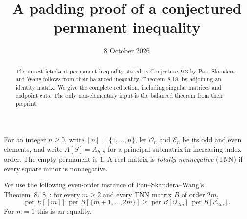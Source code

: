 \documentclass[11pt]{article}
\title{A padding proof of a conjectured permanent inequality}
\author{}
\date{8 October 2026}
\newcommand{\per}{\operatorname{per}}
\newcommand{\OO}{\mathcal O}
\newcommand{\EE}{\mathcal E}
\begin{document}
\maketitle
\begin{abstract}
The unrestricted-cut permanent inequality stated as Conjecture~9.3 by Pan, Skandera, and Wang follows from their balanced inequality, Theorem~8.18, by adjoining an identity matrix. We give the complete reduction, including singular matrices and endpoint cuts. The only non-elementary input is the balanced theorem from their preprint.
\end{abstract}
For an integer $n\geq 0$, write $[n]=\{1,\dots,n\}$, let $\OO_n$ and $\EE_n$ be its odd and even elements, and write $A[S]=A_{S,S}$ for a principal submatrix in increasing index order. The empty permanent is $1$. A real matrix is \emph{totally nonnegative} (TNN) if every square minor is nonnegative.

We use the following even-order instance of Pan--Skandera--Wang's Theorem~8.18~\cite{PSW}: for every $m\geq2$ and every TNN matrix $B$ of order $2m$,
\begin{equation}\label{balanced}
\per B[[m]]\,\per B[\{m+1,\dots,2m\}]
\geq \per B[\OO_{2m}]\,\per B[\EE_{2m}].
\end{equation}
For $m=1$ this is an equality.
\end{document}
